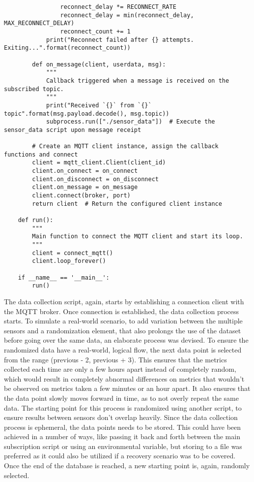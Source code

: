 \begin{verbatim}
                reconnect_delay *= RECONNECT_RATE
                reconnect_delay = min(reconnect_delay, MAX_RECONNECT_DELAY)
                reconnect_count += 1
            print("Reconnect failed after {} attempts. Exiting...".format(reconnect_count))

        def on_message(client, userdata, msg):
            """
            Callback triggered when a message is received on the subscribed topic.
            """
            print("Received `{}` from `{}` topic".format(msg.payload.decode(), msg.topic))
            subprocess.run(["./sensor_data"])  # Execute the sensor_data script upon message receipt

        # Create an MQTT client instance, assign the callback functions and connect
        client = mqtt_client.Client(client_id)
        client.on_connect = on_connect
        client.on_disconnect = on_disconnect
        client.on_message = on_message
        client.connect(broker, port)
        return client  # Return the configured client instance

    def run():
        """
        Main function to connect the MQTT client and start its loop.
        """
        client = connect_mqtt()
        client.loop_forever()

    if __name__ == '__main__':
        run()
\end{verbatim}

The data collection script, again, starts by establishing a connection client with the MQTT broker. Once connection is established, the data collection process starts. To simulate a real-world scenario, to add variation between the multiple sensors and a randomization element, that also prolongs the use of the dataset before going over the same data, an elaborate process was devised. To ensure the randomized data have a real-world, logical flow, the next data point is selected from the range (previous - 2, previous + 3). This ensures that the metrics collected each time are only a few hours apart instead of completely random, which would result in completely abnormal differences on metrics that wouldn't be observed on metrics taken a few minutes or an hour apart. It also ensures that the data point slowly moves forward in time, as to not overly repeat the same data. The starting point for this process is randomized using another script, to ensure results between sensors don't overlap heavily. Since the data collection process is ephemeral, the data points needs to be stored. This could have been achieved in a number of ways, like passing it back and forth between the main subscription script or using an environmental variable, but storing to a file was preferred as it could also be utilized if a recovery scenario was to be covered. Once the end of the database is reached, a new starting point is, again, randomly selected.

